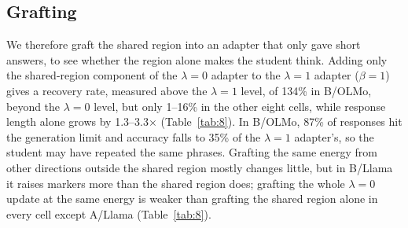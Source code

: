 \begin{table}[t]
\centering
\small

\caption{Reflective-marker frequency (per 1,000 words) and response length when the shared region is removed from the $\lambda=0$ adapter. Other removed removes the same energy from other directions outside the shared region, Top removed (matched) removes the same energy from the top singular components of the update, Scaled down scales the whole update down by the same amount, and Length-matched cut cuts the original adapter at the same mean length as the adapter with the shared region removed. The last two columns are a control that applies the same edit to the $\lambda=1$ adapter. Reflective markers disappear most clearly when the shared region is removed. Values after $\pm$ are standard deviations across three seeds.}
\label{tab:6}
\end{table}

\begin{table}[t]
\centering
\small

\caption{MATH-500 accuracy (\%) of the edited $\lambda=0$ adapter. Length-matched cut cuts the original adapter at the same mean length as the adapter with the shared region removed and then has it write the answer; the other columns are as in Table~\ref{tab:6}. The adapter with the shared region removed is the most accurate and is above the length-matched cut in all nine cells. Values after $\pm$ are standard deviations across three seeds.}
\label{tab:7}
\end{table}

\subsection{Grafting}\label{sec:graft}

We therefore graft the shared region into an adapter that only gave short answers, to see whether the region alone makes the student think. Adding only the shared-region component of the $\lambda=0$ adapter to the $\lambda=1$ adapter ($\beta=1$) gives a recovery rate, measured above the $\lambda=1$ level, of 134\% in B/OLMo, beyond the $\lambda=0$ level, but only 1--16\% in the other eight cells, while response length alone grows by 1.3--3.3$\times$ (Table~\ref{tab:8}). In B/OLMo, 87\% of responses hit the generation limit and accuracy falls to 35\% of the $\lambda=1$ adapter's, so the student may have repeated the same phrases. Grafting the same energy from other directions outside the shared region mostly changes little, but in B/Llama it raises markers more than the shared region does; grafting the whole $\lambda=0$ update at the same energy is weaker than grafting the shared region alone in every cell except A/Llama (Table~\ref{tab:8}).

